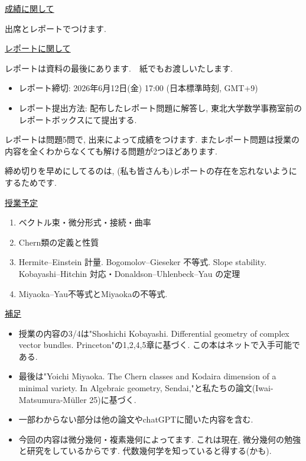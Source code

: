 \documentclass[dvipdfmx,a4paper,11pt]{article} %
\theoremstyle{definition}
\theoremstyle{remark}
\numberwithin{equation}{section}
\begin{document}
{\Large \underline{成績に関して}}

出席とレポートでつけます. 


\medskip
{\Large \underline{レポートに関して}}

レポートは資料の最後にあります.　紙でもお渡しいたします. 
\begin{itemize}
  \setlength{\parskip}{0cm} 
  \setlength{\itemsep}{0cm}
\item レポート締切: 2026年6月12日(金) 17:00 (日本標準時刻, GMT+9)
\item レポート提出方法: 配布したレポート問題に解答し, 東北大学数学事務室前のレポートボックスにて提出する. 
\end{itemize}

レポートは問題5問で, 出来によって成績をつけます. 
またレポート問題は授業の内容を全くわからなくても解ける問題が2つほどあります. 


締め切りを早めにしてるのは, (私も皆さんも)レポートの存在を忘れないようにするためです. 

\medskip
{\Large \underline{授業予定}}

\begin{enumerate}
  \setlength{\parskip}{0cm} 
  \setlength{\itemsep}{0cm}
\item ベクトル束・微分形式・接続・曲率 
\item Chern類の定義と性質
\item Hermite--Einstein 計量. Bogomolov--Gieseker 不等式. Slope stability. Kobayashi--Hitchin 対応・Donaldson--Uhlenbeck--Yau の定理
\item Miyaoka--Yau不等式とMiyaokaの不等式. 
\end{enumerate}


{\Large \underline{補足}}

\begin{itemize}
  \setlength{\parskip}{0cm} 
  \setlength{\itemsep}{0cm}
\item 授業の内容の3/4は"Shoshichi Kobayashi. Differential geometry of complex vector bundles. Princeton"の1,2,4,5章に基づく. この本はネットで入手可能である. 
\item 最後は"Yoichi Miyaoka. The Chern classes and Kodaira dimension of a minimal variety. In Algebraic geometry, Sendai,"と私たちの論文(Iwai-Matsumura-Müller 25)に基づく. 
\item 一部わからない部分は他の論文やchatGPTに聞いた内容を含む. 
\item 今回の内容は微分幾何・複素幾何によってます.  これは現在, 微分幾何の勉強と研究をしているからです. 代数幾何学を知っていると得する(かも). 
\end{itemize}
\end{document}
